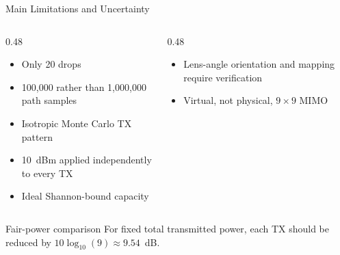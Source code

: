 \begin{frame}[t,shrink=22]{Main Limitations and Uncertainty}
    \begin{columns}[T,onlytextwidth]
        \begin{column}{0.48\textwidth}
            \begin{itemize}
                \item Only 20 drops
                \item 100,000 rather than 1,000,000 path samples
                \item Isotropic Monte Carlo TX pattern
                \item 10~dBm applied independently to every TX
                \item Ideal Shannon-bound capacity
            \end{itemize}
        \end{column}
        \begin{column}{0.48\textwidth}
            \begin{itemize}
                \item Lens-angle orientation and mapping require verification
                \item Virtual, not physical, $9\times9$ MIMO
            \end{itemize}
        \end{column}
    \end{columns}
    \begin{alertblock}{Fair-power comparison}
        For fixed total transmitted power, each TX should be reduced by
        $10\log_{10}(9)\approx9.54$~dB.
    \end{alertblock}
\end{frame}


